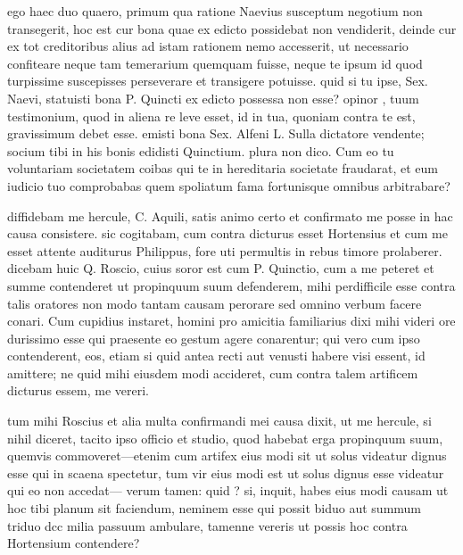  ego haec duo quaero, primum qua ratione Naevius susceptum negotium non transegerit, hoc est cur bona quae ex edicto possidebat non vendiderit, deinde cur ex tot creditoribus alius ad istam rationem nemo accesserit, ut necessario confiteare neque tam temerarium quemquam fuisse, neque te ipsum id quod turpissime suscepisses perseverare et transigere potuisse. quid si tu ipse, Sex. Naevi, statuisti bona P. Quincti ex edicto possessa non esse? opinor , tuum testimonium, quod in aliena re leve esset, id in tua, quoniam contra te est, gravissimum debet esse. emisti bona Sex. Alfeni L. Sulla dictatore vendente; socium tibi in his bonis edidisti Quinctium. plura non dico. Cum eo tu voluntariam societatem coibas qui te in hereditaria societate fraudarat, et eum iudicio tuo comprobabas quem spoliatum fama fortunisque omnibus arbitrabare?

 diffidebam me hercule, C. Aquili, satis animo certo et confirmato me posse in hac causa consistere. sic cogitabam, cum contra dicturus esset Hortensius et cum me esset attente auditurus Philippus, fore uti permultis in rebus timore prolaberer. dicebam huic Q. Roscio, cuius soror est cum P. Quinctio, cum a me peteret et summe contenderet ut propinquum suum defenderem, mihi perdifficile esse contra talis oratores non modo tantam causam perorare sed omnino verbum facere conari. Cum cupidius instaret, homini pro amicitia familiarius dixi mihi videri ore durissimo esse qui praesente eo gestum agere conarentur; qui vero cum ipso contenderent, eos, etiam si quid antea recti aut venusti habere visi essent, id amittere; ne quid mihi eiusdem modi accideret, cum contra talem artificem dicturus essem, me vereri.

 tum mihi Roscius et alia multa confirmandi mei causa dixit, ut me hercule, si nihil diceret, tacito ipso officio et studio, quod habebat erga propinquum suum, quemvis commoveret—etenim cum artifex eius modi sit ut solus videatur dignus esse qui in scaena spectetur, tum vir eius modi est ut solus dignus esse videatur qui eo non accedat— verum tamen: quid ? si, inquit, habes eius modi causam ut hoc tibi planum sit faciendum, neminem esse qui possit biduo aut summum triduo dcc milia passuum ambulare, tamenne vereris ut possis hoc contra Hortensium contendere?

